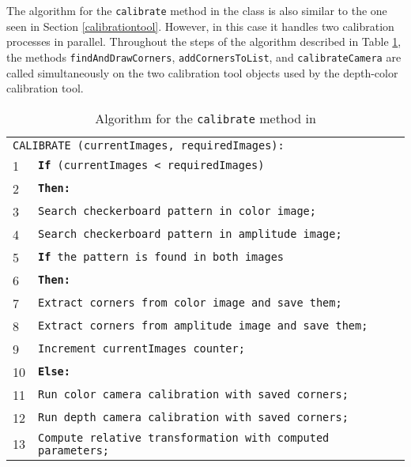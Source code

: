 The algorithm for the \texttt{cal\-i\-brate} method in the \DepthColorCalibrationTool{} class is also similar to the 
one seen in Section \ref{calibrationtool}. However, in this case it handles two calibration processes in parallel.
Throughout the steps of the algorithm described in Table \ref{depthcolorcalibratealgorithm}, the methods
\texttt{find\-And\-Draw\-Cor\-ners}, \texttt{add\-Cor\-ners\-To\-List}, and \texttt{cal\-i\-brate\-Cam\-er\-a}  
are called simultaneously on the two calibration tool objects used by the depth-color calibration tool.

\begin{table}[ht]
\caption{Algorithm for the \texttt{calibrate} method in \DepthColorCalibrationTool{}}
\begin{center}
\begin{tabular}{ l l }
\hline
\multicolumn{2}{l}{\texttt{CALIBRATE (currentImages, requiredImages):}} \\
1 & \texttt{{\bf If} (currentImages < requiredImages)} \\
2 & \hspace{0.6cm} \texttt{\bf Then:} \\
3 & \hspace{1.2cm} \texttt{Search checkerboard pattern in color image;} \\
4 & \hspace{1.2cm} \texttt{Search checkerboard pattern in amplitude image;} \\
5 & \hspace{1.2cm} \texttt{{\bf If} the pattern is found in both images} \\
6 & \hspace{1.8cm} \texttt{\bf Then:} \\
7 & \hspace{2.4cm} \texttt{Extract corners from color image and save them;} \\
8 & \hspace{2.4cm} \texttt{Extract corners from amplitude image and save them;} \\
9 & \hspace{2.4cm} \texttt{Increment currentImages counter;} \\
10 & \hspace{0.6cm} \texttt{\bf Else:} \\
11 & \hspace{1.2cm} \texttt{Run color camera calibration with saved corners;} \\
12 & \hspace{1.2cm} \texttt{Run depth camera calibration with saved corners;} \\
13 & \hspace{1.2cm} \texttt{Compute relative transformation with computed parameters;} \\
\hline
\end{tabular}
\end{center}
\label{depthcolorcalibratealgorithm}
\end{table}


